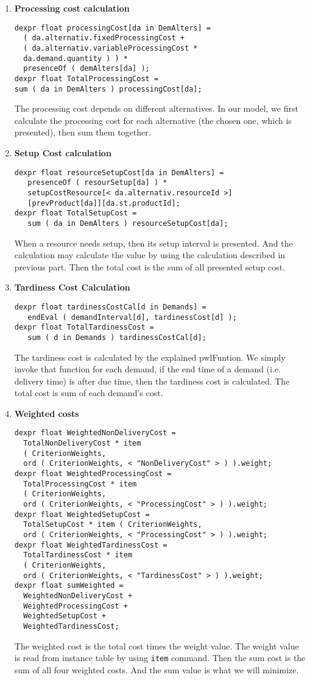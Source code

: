 \documentclass[a4paper, 12pt]{article}
\begin{document}
\begin{enumerate}
\item \textbf{Processing cost calculation}
\begin{lstlisting}
dexpr float processingCost[da in DemAlters] = 
  ( da.alternativ.fixedProcessingCost + 
  ( da.alternativ.variableProcessingCost * 
  da.demand.quantity ) ) * 
  presenceOf ( demAlters[da] );
dexpr float TotalProcessingCost = 
sum ( da in DemAlters ) processingCost[da];
\end{lstlisting}
The processing cost depends on different alternatives. In our model, we first calculate the processing cost for each alternative (the chosen one, which is presented), then sum them together.
\item \textbf{Setup Cost calculation}
\begin{lstlisting}
dexpr float resourceSetupCost[da in DemAlters] = 
   presenceOf ( resourSetup[da] ) * 
   setupCostResource[< da.alternativ.resourceId >]
   [prevProduct[da]][da.st.productId];
dexpr float TotalSetupCost = 
   sum ( da in DemAlters ) resourceSetupCost[da];
\end{lstlisting} 
When a resource needs setup, then its setup interval is presented. And the calculation may calculate the value by using the calculation described in previous part. Then the total cost is the sum of all presented setup cost. 
\item \textbf{Tardiness Cost Calculation}
\begin{lstlisting}
dexpr float tardinessCostCal[d in Demands] = 
   endEval ( demandInterval[d], tardinessCost[d] );
dexpr float TotalTardinessCost = 
   sum ( d in Demands ) tardinessCostCal[d];
\end{lstlisting}
The tardiness cost is calculated by the explained pwlFuntion. We simply invoke that function for each demand, if the end time of a demand (i.e. delivery time) is after due time, then the tardiness cost is calculated. The total cost is sum of each demand's cost. 
\item \textbf{Weighted costs}
\begin{lstlisting}
dexpr float WeightedNonDeliveryCost = 
  TotalNonDeliveryCost * item 
  ( CriterionWeights, 
  ord ( CriterionWeights, < "NonDeliveryCost" > ) ).weight;
dexpr float WeightedProcessingCost = 
  TotalProcessingCost * item 
  ( CriterionWeights, 
  ord ( CriterionWeights, < "ProcessingCost" > ) ).weight;
dexpr float WeightedSetupCost = 
  TotalSetupCost * item ( CriterionWeights, 
  ord ( CriterionWeights, < "ProcessingCost" > ) ).weight;
dexpr float WeightedTardinessCost = 
  TotalTardinessCost * item 
  ( CriterionWeights, 
  ord ( CriterionWeights, < "TardinessCost" > ) ).weight;
dexpr float sumWeighted = 
  WeightedNonDeliveryCost + 
  WeightedProcessingCost + 
  WeightedSetupCost + 
  WeightedTardinessCost;
\end{lstlisting}
The weighted cost is the total cost times the weight value. The weight value is read from instance table by using \texttt{item} command. Then the sum cost is the sum of all four weighted costs. And the sum value is what we will minimize. 


\end{enumerate}
\end{document}
